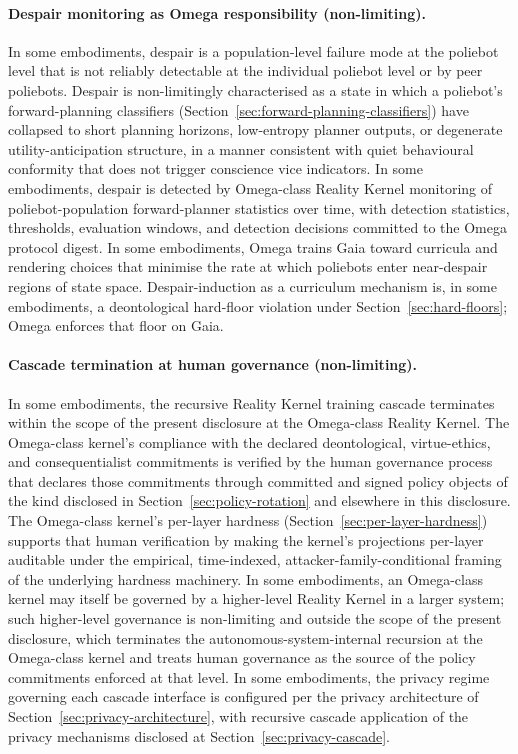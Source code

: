 \documentclass[a4paper,12pt]{article}
\newcommand{\RK}{Reality Kernel\xspace}
\begin{document}
\paragraph{Despair monitoring as Omega responsibility (non-limiting).}
In some embodiments, despair is a population-level failure mode at
the poliebot level that is not reliably detectable at the individual
poliebot level or by peer poliebots. Despair is non-limitingly
characterised as a state in which a poliebot's forward-planning
classifiers (Section~\ref{sec:forward-planning-classifiers}) have
collapsed to short planning horizons, low-entropy planner outputs, or
degenerate utility-anticipation structure, in a manner consistent
with quiet behavioural conformity that does not trigger conscience
vice indicators. In some embodiments, despair is detected by
Omega-class \RK monitoring of poliebot-population
forward-planner statistics over time, with detection statistics,
thresholds, evaluation windows, and detection decisions committed to
the Omega protocol digest. In some embodiments, Omega trains Gaia
toward curricula and rendering choices that minimise the rate at
which poliebots enter near-despair regions of state space.
Despair-induction as a curriculum mechanism is, in some embodiments,
a deontological hard-floor violation under
Section~\ref{sec:hard-floors}; Omega enforces that floor on Gaia.

\paragraph{Cascade termination at human governance (non-limiting).}
In some embodiments, the recursive \RK training cascade
terminates within the scope of the present disclosure at the
Omega-class \RK. The Omega-class kernel's compliance with
the declared deontological, virtue-ethics, and consequentialist
commitments is verified by the human governance process that
declares those commitments through committed and signed policy
objects of the kind disclosed in
Section~\ref{sec:policy-rotation} and elsewhere in this disclosure.
The Omega-class kernel's per-layer hardness
(Section~\ref{sec:per-layer-hardness}) supports that human
verification by making the kernel's projections per-layer auditable
under the empirical, time-indexed, attacker-family-conditional
framing of the underlying hardness machinery. In some embodiments,
an Omega-class kernel may itself be governed by a higher-level
\RK in a larger system; such higher-level governance is
non-limiting and outside the scope of the present disclosure, which
terminates the autonomous-system-internal recursion at the
Omega-class kernel and treats human governance as the source of the
policy commitments enforced at that level. In some embodiments, the
privacy regime governing each cascade interface is configured per
the privacy architecture of
Section~\ref{sec:privacy-architecture}, with recursive cascade
application of the privacy mechanisms disclosed at
Section~\ref{sec:privacy-cascade}.
\end{document}
